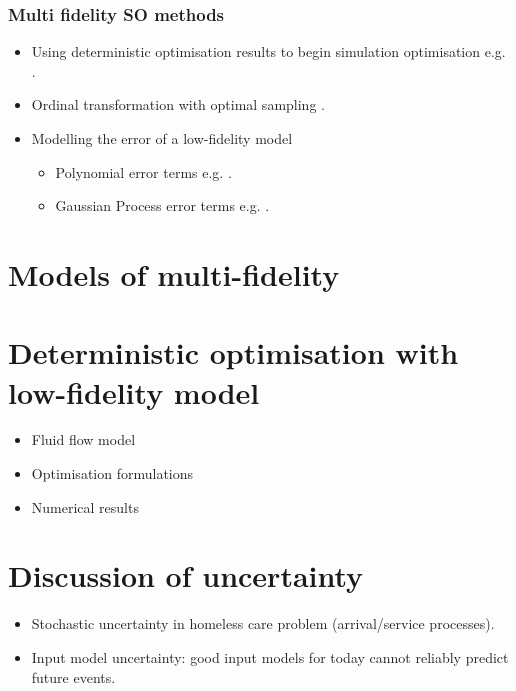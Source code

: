 \documentclass{article}
\begin{document}
\subsubsection{Multi fidelity SO methods}

\begin{itemize}[noitemsep]
\item Using deterministic optimisation results to begin simulation optimisation e.g. \cite{jian2015introduction}.
\item Ordinal transformation with optimal sampling \citep{xu2016mo2tos}.
\item Modelling the error of a low-fidelity model
\begin{itemize}[noitemsep]
\item Polynomial error terms e.g. \cite{chong2018simulation}.
\item Gaussian Process error terms e.g. \cite{huang2006sequential}.
\end{itemize}
\end{itemize}

\section{Models of multi-fidelity} \label{models}

\section{Deterministic optimisation with low-fidelity model} \label{do}

\begin{itemize}[noitemsep]
\item Fluid flow model
\item Optimisation formulations
\item Numerical results
\end{itemize}

\section{Discussion of uncertainty} \label{uncert}

\begin{itemize}[noitemsep]
\item Stochastic uncertainty in homeless care problem (arrival/service processes).
\item Input model uncertainty: good input models for today cannot reliably predict future events.
\end{itemize}
\end{document}
